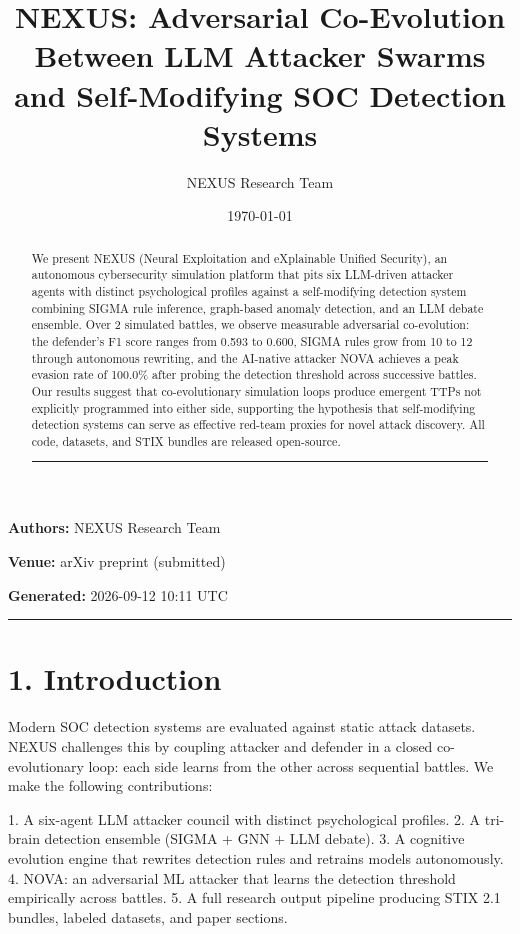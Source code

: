 \documentclass{article}
\title{NEXUS: Adversarial Co-Evolution Between LLM Attacker Swarms and Self-Modifying SOC Detection Systems}
\author{NEXUS Research Team}
\date{\today}
\begin{document}
\maketitle


\textbf{Authors:} NEXUS Research Team  

\textbf{Venue:} arXiv preprint (submitted)  

\textbf{Generated:} 2026-09-12 10:11 UTC  

\hrule\vspace{6pt}

\begin{abstract}

We present NEXUS (Neural Exploitation and eXplainable Unified Security), an autonomous cybersecurity simulation platform that pits six LLM-driven attacker agents with distinct psychological profiles against a self-modifying detection system combining SIGMA rule inference, graph-based anomaly detection, and an LLM debate ensemble. Over 2 simulated battles, we observe measurable adversarial co-evolution: the defender's F1 score ranges from 0.593 to 0.600, SIGMA rules grow from 10 to 12 through autonomous rewriting, and the AI-native attacker NOVA achieves a peak evasion rate of 100.0\% after probing the detection threshold across successive battles. Our results suggest that co-evolutionary simulation loops produce emergent TTPs not explicitly programmed into either side, supporting the hypothesis that self-modifying detection systems can serve as effective red-team proxies for novel attack discovery. All code, datasets, and STIX bundles are released open-source.


\hrule\vspace{6pt}

\end{abstract}

\section{1. Introduction}

Modern SOC detection systems are evaluated against static attack datasets. NEXUS challenges this by coupling attacker and defender in a closed co-evolutionary loop: each side learns from the other across sequential battles. We make the following contributions:

1. A six-agent LLM attacker council with distinct psychological profiles.
2. A tri-brain detection ensemble (SIGMA + GNN + LLM debate).
3. A cognitive evolution engine that rewrites detection rules and retrains models autonomously.
4. NOVA: an adversarial ML attacker that learns the detection threshold empirically across battles.
5. A full research output pipeline producing STIX 2.1 bundles, labeled datasets, and paper sections.
\end{document}
